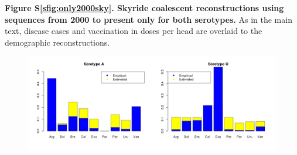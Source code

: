 \documentclass[a4paper,10pt]{article}
\begin{document}
\textbf{Figure S\ref{sfig:only2000sky}. Skyride coalescent reconstructions using sequences from 2000 to present only for both serotypes.}
As in the main text, disease cases and vaccination in doses per head are overlaid to the demographic reconstructions.


\newpage


\newpage
\begin{center}
\begin{figure}[H]
\begin{center}
\includegraphics[scale=.35]{FIGURES/FMDV_frequencies_fixed.jpeg}
\end{center}
\caption{}
\label{sfig:freqs}
\end{figure}
\end{center}
\newpage
\end{document}
